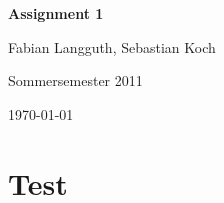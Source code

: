 



% 

\begin{center}
    \huge {\bf Assignment 1}
    
    \small Fabian Langguth, Sebastian Koch
    
    Sommersemester 2011
    
    \today
\end{center}
\section*{Test}


